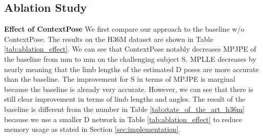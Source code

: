 \subsection{Ablation Study}

\begin{table}
    \centering
    \caption{Ablative study on the global attention and pairwise attention in ContextPose. We show the MPJPE (mm), MPLLE (mm) and MPLAE (radian) on each test subject separately. ContextPose achieves large improvement on the more challenging subject of S.}
    \label{tab:ablation_effect}
\end{table}

\noindent\textbf{Effect of ContextPose}
\label{sec:ablation_effect}
We first compare our approach to the baseline w/o ContextPose. The results on the H36M dataset are shown in Table \ref{tab:ablation_effect}. We can see that ContextPose notably decreases MPJPE of the baseline from mm to mm on the challenging subject S. MPLLE decreases by nearly  meaning that the limb lengths of the estimated D poses are more accurate than the baseline. The improvement for S in terms of MPJPE is marginal because the baseline is already very accurate. However, we can see that there is still clear improvement in terms of limb lengths and angles. The result of the baseline is different from the number in Table \ref{tab:state_of_the_art_h36m} because we use a smaller D network in Table \ref{tab:ablation_effect} to reduce memory usage as stated in Section \ref{sec:implementation}. 

